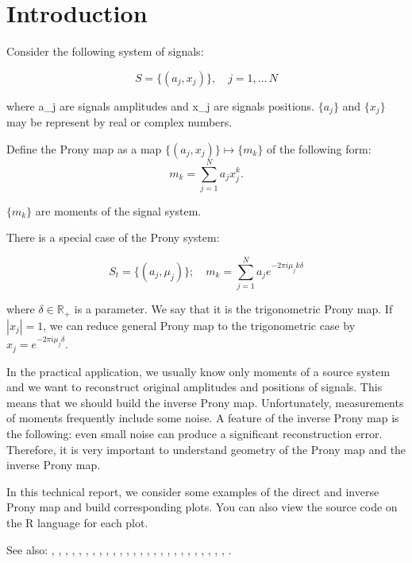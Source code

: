 \section{Introduction}

Consider the following system of signals:

$$
S = \{ (a_j, x_j) \}, \quad j = 1, \ldots\, N
$$

where a_j are signals amplitudes and x_j are signals positions. $\{a_j\}$ and $\{x_j\}$ may be represent by real or complex numbers. \par

Define the Prony map as a map $\{ (a_j, x_j) \} \mapsto \{m_k\}$ of the following form:
$$
m_k = \sum_{j=1}^N a_j x_j^k.
$$
  
$\{m_k\}$ are moments of the signal system.

There is a special case of the Prony system:

$$
S_t = \{ (a_j, \mu_j) \}; \quad m_k = \sum_{j=1}^N a_j e^{-2\pi i \mu_j k \delta}
$$

where $\delta \in \mathbb{R}_+$ is a parameter. We say that it is the trigonometric Prony map. If $|x_j| = 1$, we can reduce general Prony map to the trigonometric case by $x_j = e^{-2\pi i \mu_j \delta}$.

In the practical application, we usually know only moments of a source system and we want to reconstruct original amplitudes and positions of signals. This means that we should build the inverse Prony map. Unfortunately, measurements of moments frequently include some noise. A feature of the inverse Prony map is the following: even small noise can produce a significant reconstruction error. Therefore, it is very important to understand geometry of the Prony map and the inverse Prony map.

In this technical report, we consider some examples of the direct and inverse Prony map and build corresponding plots. You can also view the source code on the R language for each plot.

See also: \cite{2015arXiv150206932A}, \cite{azais_spike}, \cite{batenkov_numerical_2014}, \cite{batenkov_accurate_2014}, \cite{Bat.Sar.Yom}, \cite{Bat.Yom2}, \cite{Bat.Yom.Sampta13}, \cite{Bat.Yom1}, \cite{candes_towards_2014}, \cite{candes_super-resolution_2013}, \cite{demanet_super-resolution_2013}, \cite{donoho_superresolution_1992}, \cite{Don1}, \cite{duval_exact_2013}, \cite{fernandez-granda_support_2013}, \cite{heckel_super-resolution_2014}, \cite{Lev.Ful}, \cite{liao_music_2014}, \cite{McC}, \cite{Min.Kaw.Min}, \cite{moitra_threshold_2014}, \cite{Ode.Bar.Pis}, \cite{Sle}, \cite{Yom2}, \cite{Yom1}, \cite{Dem.Ngu}, \cite{Mor.Can}.
  
  
  
  
  
  
  
  
  
  
  
  
  